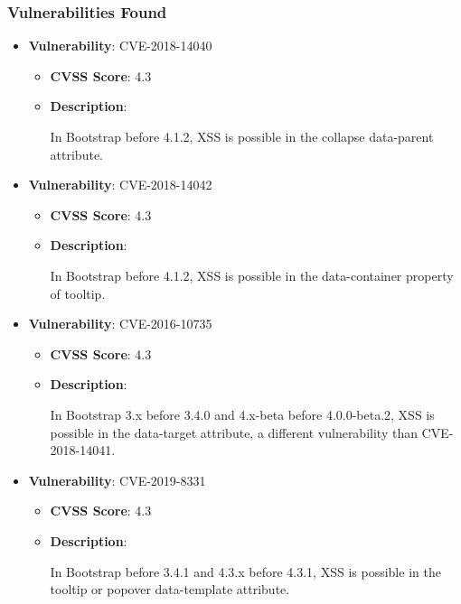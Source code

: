 \documentclass{article}
\begin{document}
\subsubsection*{Vulnerabilities Found}

\begin{itemize}
    
        \item \textbf{Vulnerability}: CVE-2018-14040
        \begin{itemize}
            \item \textbf{CVSS Score}:  4.3 
            \item \textbf{Description}:
            \parbox[t]{0.9\linewidth}{
                \ttfamily In Bootstrap before 4.1.2, XSS is possible in the collapse data-parent attribute.
            }
        \end{itemize}
    
        \item \textbf{Vulnerability}: CVE-2018-14042
        \begin{itemize}
            \item \textbf{CVSS Score}:  4.3 
            \item \textbf{Description}:
            \parbox[t]{0.9\linewidth}{
                \ttfamily In Bootstrap before 4.1.2, XSS is possible in the data-container property of tooltip.
            }
        \end{itemize}
    
        \item \textbf{Vulnerability}: CVE-2016-10735
        \begin{itemize}
            \item \textbf{CVSS Score}:  4.3 
            \item \textbf{Description}:
            \parbox[t]{0.9\linewidth}{
                \ttfamily In Bootstrap 3.x before 3.4.0 and 4.x-beta before 4.0.0-beta.2, XSS is possible in the data-target attribute, a different vulnerability than CVE-2018-14041.
            }
        \end{itemize}
    
        \item \textbf{Vulnerability}: CVE-2019-8331
        \begin{itemize}
            \item \textbf{CVSS Score}:  4.3 
            \item \textbf{Description}:
            \parbox[t]{0.9\linewidth}{
                \ttfamily In Bootstrap before 3.4.1 and 4.3.x before 4.3.1, XSS is possible in the tooltip or popover data-template attribute.
            }
        \end{itemize}
    

\end{itemize}
\end{document}
